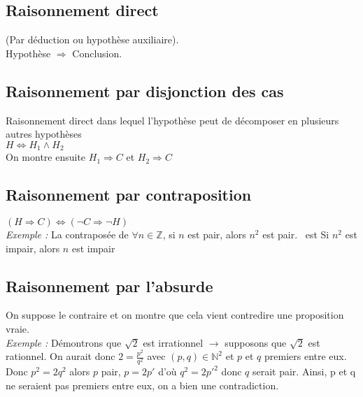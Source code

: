     \begin{multicols}{2}
      \raggedcolumns
      
      \subsection{Raisonnement direct}\label{subsec:raisonnement-direct}
        
        (Par déduction ou hypothèse auxiliaire).\\
        Hypothèse $\Rightarrow$ Conclusion.
      
      \subsection{Raisonnement par disjonction des cas}\label{subsec:raisonnement-par-disjonction-des-cas}
        
        Raisonnement direct dans lequel l'hypothèse peut de décomposer en plusieurs autres hypothèses\\
        $H \Leftrightarrow H_1 \land H_2$\\
        On montre ensuite $H_1 \Rightarrow C$ et $H_2 \Rightarrow C$
      
      \subsection{Raisonnement par contraposition}\label{subsec:raisonnement-par-contraposition}
        
        $(H \Rightarrow C) \Leftrightarrow (\neg C \Rightarrow \neg H)$\\
        \textit{Exemple :} La contraposée de \og $\forall n \in \mathbb{Z}$, si $n$ est pair, alors $n^2$ est pair. \fg\ est \og Si $n^2$ est impair, alors $n$ est impair \fg
      
      \subsection{Raisonnement par l'absurde}\label{subsec:raisonnement-par-l'absurde}
        
        On suppose le contraire et on montre que cela vient contredire une proposition vraie.\\
        \textit{Exemple :} Démontrons que $\sqrt{2}$ est irrationnel $\rightarrow$ supposons que $\sqrt{2}$ est rationnel.
        On aurait donc $2 = \frac{p^2}{q^2}$ avec $(p, q) \in \mathbb{N}^2$ et $p$ et $q$ premiers entre eux.
        Donc $p^2 = 2q^2$ alors $p$ pair, $p = 2p'$ d'où $q^2 = 2p'^2$ donc $q$ serait pair.
        Ainsi, p et q ne seraient pas premiers entre eux, on a bien une contradiction.
      

\end{multicols}

